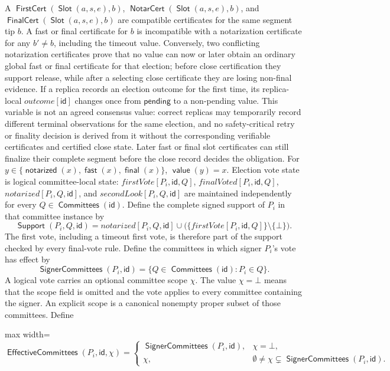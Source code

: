 \documentclass[sigplan,twocolumn,review,anonymous]{acmart}
\newcommand{\func}[1]{\operatorname{\mathsf{#1}}}
\newcommand{\NotarCert}{\func{NotarCert}}
\newcommand{\FirstCert}{\func{FirstCert}}
\newcommand{\FinalCert}{\func{FinalCert}}
\newcommand{\id}{\mathsf{id}}
\newcommand{\Slot}{\func{Slot}}
\newcommand{\SignerCommittees}{\func{SignerCommittees}}
\newcommand{\EffectiveCommittees}{\func{EffectiveCommittees}}
\newcommand{\valueOf}{\func{value}}
\newcommand{\pending}{\mathsf{pending}}
\newcommand{\notarized}{\func{notarized}}
\newcommand{\fast}{\func{fast}}
\newcommand{\final}{\func{final}}
\newcommand{\Committees}{\func{Committees}}
\begin{document}
A \(\FirstCert(\Slot(a,s,e),b)\), \(\NotarCert(\Slot(a,s,e),b)\), and
\(\FinalCert(\Slot(a,s,e),b)\) are compatible certificates for the same segment tip \(b\).  A fast or final
certificate for \(b\) is incompatible with a notarization certificate for any \(b'\neq b\), including
the timeout value.  Conversely, two conflicting notarization certificates prove that no value can now
or later obtain an ordinary global fast or final certificate for that election; before close
certification they support release, while after a selecting close certificate they are losing
non-final evidence.  If a replica records an election outcome for the first time, its replica-local
\(outcome[\id]\) changes once from \(\pending\) to a non-pending value.  This variable is not an
agreed consensus value: correct replicas may temporarily record different terminal observations for
the same election, and no safety-critical retry or finality decision is derived from it without the
corresponding verifiable certificates and certified close state.  Later fast or final slot certificates
can still finalize their complete segment before the close record decides the obligation.  For
\(y\in\{\notarized(x),\fast(x),\final(x)\}\), \(\valueOf(y)=x\).  Election vote state is
logical committee-local state: \(firstVote[P_i,\id,Q]\), \(finalVoted[P_i,\id,Q]\),
\(notarized[P_i,Q,\id]\), and \(secondLook[P_i,Q,\id]\) are maintained independently for every
\(Q\in\Committees(\id)\).  Define the complete signed support of \(P_i\) in that committee instance by
\[
\func{Support}(P_i,Q,\id)=
notarized[P_i,Q,\id]\cup\bigl(\{firstVote[P_i,\id,Q]\}\setminus\{\bot\}\bigr).
\]
The first vote, including a timeout first vote, is therefore part of the support checked by every
final-vote rule.  Define the committees in which signer \(P_i\)'s vote has effect by
\[
\SignerCommittees(P_i,\id)=\{Q\in\Committees(\id):P_i\in Q\}.
\]
A logical vote carries an optional committee scope \(\chi\).  The value \(\chi=\bot\) means that the
scope field is omitted and the vote applies to every committee containing the signer.  An explicit
scope is a canonical nonempty proper subset of those committees.  Define
\begin{center}
\begin{adjustbox}{max width=\columnwidth}
\(\displaystyle
\EffectiveCommittees(P_i,\id,\chi)=
\begin{cases}
\SignerCommittees(P_i,\id), & \chi=\bot,\\
\chi, & \emptyset\neq\chi\subsetneq\SignerCommittees(P_i,\id).
\end{cases}
\)
\end{adjustbox}
\end{center}
\end{document}
